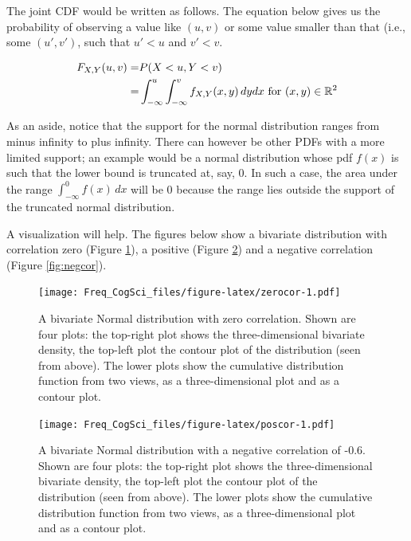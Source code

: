 \documentclass[
  12pt,
]{krantz}
\theoremstyle{definition}
\theoremstyle{definition}
\theoremstyle{definition}
\theoremstyle{definition}
\theoremstyle{remark}
\begin{document}
The joint CDF would be written as follows. The equation below gives us the probability of observing a value like \((u,v)\) or some value smaller than that (i.e., some \((u',v')\), such that \(u'<u\) and \(v'<v\).

\begin{equation}
\begin{split}
F_{X,Y}(u,v) =& P(X<u,Y<v)\\
             =& \int_{-\infty}^u \int_{-\infty}^v f_{X,Y}(x,y)\, dy dx \hbox{ for } (x,y)\in \mathbb{R}^2\\
\end{split}
\end{equation}

As an aside, notice that the support for the normal distribution ranges from minus infinity to plus infinity. There can however be other PDFs with a more limited support; an example would be a normal distribution whose pdf \(f(x)\) is such that the lower bound is truncated at, say, 0. In such a case, the area under the range \(\int_{-\infty}^0 f(x) \, dx\) will be 0 because the range lies outside the support of the truncated normal distribution.

A visualization will help. The figures below show a bivariate distribution with correlation zero (Figure \ref{fig:zerocor}), a positive (Figure \ref{fig:poscor}) and a negative correlation (Figure \ref{fig:negcor}).

\begin{figure}
\centering
\texttt{[image: Freq\_CogSci\_files/figure-latex/zerocor-1.pdf]}
\caption{\label{fig:zerocor}A bivariate Normal distribution with zero correlation. Shown are four plots: the top-right plot shows the three-dimensional bivariate density, the top-left plot the contour plot of the distribution (seen from above). The lower plots show the cumulative distribution function from two views, as a three-dimensional plot and as a contour plot.}
\end{figure}

\begin{figure}
\centering
\texttt{[image: Freq\_CogSci\_files/figure-latex/poscor-1.pdf]}
\caption{\label{fig:poscor}A bivariate Normal distribution with a negative correlation of -0.6. Shown are four plots: the top-right plot shows the three-dimensional bivariate density, the top-left plot the contour plot of the distribution (seen from above). The lower plots show the cumulative distribution function from two views, as a three-dimensional plot and as a contour plot.}
\end{figure}
\end{document}

